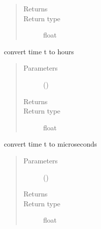 \documentclass[letterpaper,10pt,english]{sphinxmanual}
\begin{document}
\begin{fulllineitems}
\begin{fulllineitems}
\begin{quote}
\begin{description}
\item[{Returns}] \leavevmode
{}

\item[{Return type}] \leavevmode
float

\end{description}\end{quote}

\end{fulllineitems}


\begin{fulllineitems}
\label{\detokenize{Reference:salabim.Environment.to_hours}}
convert time t to hours
\begin{quote}\begin{description}
\item[{Parameters}] \leavevmode
{} () \textendash{} 

\item[{Returns}] \leavevmode
{}

\item[{Return type}] \leavevmode
float

\end{description}\end{quote}

\end{fulllineitems}


\begin{fulllineitems}
\label{\detokenize{Reference:salabim.Environment.to_microseconds}}
convert time t to microseconds
\begin{quote}\begin{description}
\item[{Parameters}] \leavevmode
{} () \textendash{} 

\item[{Returns}] \leavevmode
{}

\item[{Return type}] \leavevmode
float


\end{description}
\end{quote}
\end{fulllineitems}
\end{fulllineitems}
\end{document}
